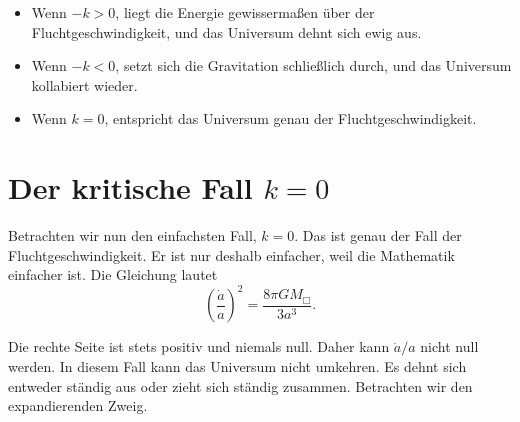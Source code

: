 \begin{itemize}
\item Wenn \(-k>0\), liegt die Energie gewissermaßen über der Fluchtgeschwindigkeit, und das Universum dehnt sich ewig aus.
\item Wenn \(-k<0\), setzt sich die Gravitation schließlich durch, und das Universum kollabiert wieder.
\item Wenn \(k=0\), entspricht das Universum genau der Fluchtgeschwindigkeit.
\end{itemize}

\begin{classroomqa}
\end{classroomqa}

\section{Der kritische Fall \(k=0\)}

Betrachten wir nun den einfachsten Fall, \(k=0\). Das ist genau der Fall der Fluchtgeschwindigkeit. Er ist nur deshalb einfacher, weil die Mathematik einfacher ist. Die Gleichung lautet
\begin{equation}
\left(\frac{\dot a}{a}\right)^2=\frac{8\pi G M_{\Box}}{3a^3}.
\end{equation}

Die rechte Seite ist stets positiv und niemals null. Daher kann \(\dot a/a\) nicht null werden. In diesem Fall kann das Universum nicht umkehren. Es dehnt sich entweder ständig aus oder zieht sich ständig zusammen. Betrachten wir den expandierenden Zweig.

